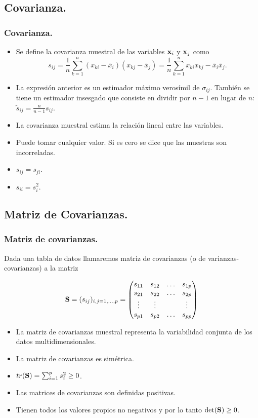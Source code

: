 \subsection{Covarianza.}
\begin{frame}
\frametitle{Covarianza.}


\begin{itemize}
\item Se define la covarianza muestral de las variables $\mathbf{x}_i$ y $\mathbf{x}_j$ como
$$s_{i j}=\frac{1}{n} \sum_{k =1}^n(x_{k i}-\overline{x}_i)(x_{k j}-\overline{x}_j)= 
\frac{1}{n} \sum_{k =1}^n x_{k i} x_{k j} - \overline{x}_i \overline{x}_j.$$

\item La expresión anterior es un estimador máximo verosímil de $\sigma_{i j}$. También se tiene un estimador insesgado que consiste en dividir por $n-1$ en lugar de $n$: $\tilde{s}_{ij} =\frac{n}{n-1} s_{ij}$.

\item La covarianza muestral estima la relación lineal entre las variables. 
\item Puede tomar cualquier valor. Si es cero se dice que las muestras son incorreladas.
\item $s_{i j}= s_{j i}$.
\item $s_{i i}=s_{i}^2$.
\end{itemize}

\end{frame}

\subsection{Matriz de Covarianzas.}

\begin{frame}
\frametitle{Matriz de covarianzas.}

Dada una tabla de datos llamaremos matriz de covarianzas (o de varianzas-covarianzas) a  la matriz

$$
\mathbf{S}=(s_{i j})_{i,j=1,\ldots,p}=
\begin{pmatrix}  
 s_{1 1} & s_{1 2} & \ldots & s_{1 p}\\
 s_{2 1} & s_{2 2} & \ldots & s_{2 p}\\
  \vdots & \vdots  &        & \vdots\\
 s_{p 1} & s_{p 2} & \ldots & s_{p p}
\end{pmatrix}
$$

\begin{itemize}
\item La matriz de covarianzas muestral representa la variabilidad conjunta de los datos multidimensionales.
\item La matriz de covarianzas es simétrica.
\item $tr(\mathbf{S})=\sum_{i=1}^p s_i^2\geq 0$.
\item Las matrices de covarianzas son definidas positivas. 
\item Tienen todos los valores propios no negativos y por lo tanto $\det(\mathbf{S})\geq 0$.
\end{itemize}

\end{frame}

